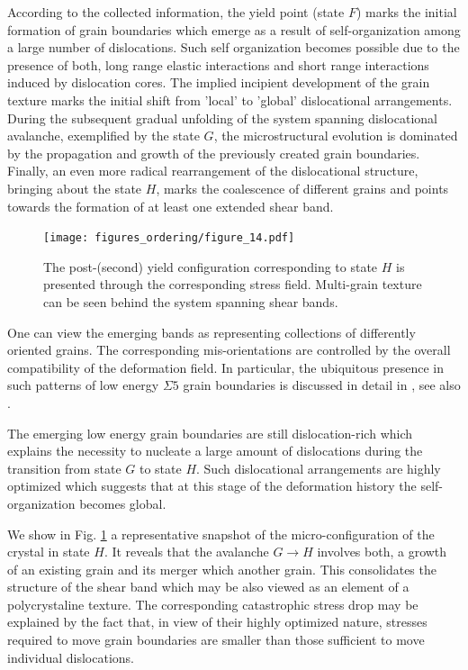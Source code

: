 \documentclass[aps,
superscriptaddress,notitlepage]{revtex4-1}
\begin{document}
According to the collected information,   the yield point (state $F$)  marks  the initial formation of grain boundaries which emerge as a result of  self-organization among  a large number of dislocations. Such self organization becomes possible due to the presence of both, long range elastic interactions and short range interactions induced by dislocation cores. The implied incipient development of the grain texture  marks the initial shift from   'local' to 'global'  dislocational arrangements. During  the subsequent gradual unfolding of the system spanning dislocational avalanche, exemplified by the state $G$,  the microstructural evolution is dominated by the propagation and growth of the previously created  grain boundaries. Finally,  an even more radical rearrangement of the dislocational structure,  bringing about the state $H$,   marks the  coalescence of different grains and points towards  the formation of  at least one extended shear band. 
 \begin{figure}[h!]
\texttt{[image: figures\_ordering/figure\_14.pdf]}
\caption{The post-(second) yield configuration corresponding to state $H$ is presented through   the corresponding stress field.  Multi-grain texture can be  seen behind the  system spanning shear bands.}
\label{grains3}
\end{figure}
One can view  the emerging bands as representing  collections of differently oriented  grains. The corresponding mis-orientations  are controlled by the overall compatibility of the deformation field. In particular, the  ubiquitous presence  in such patterns of  low energy $\Sigma 5$  grain boundaries is  discussed in detail in \cite{Baggio2023-qu}, see also \cite{Sutton1984-us,Priester2012-wx,Randle2024-tf}.

The emerging low energy grain  boundaries are  still dislocation-rich  which  explains the necessity to nucleate a large amount of dislocations during the transition from state $G$ to state $H$. Such dislocational arrangements are   highly optimized  which suggests that at this stage of the deformation history the  self-organization becomes  global.  

We show in  Fig. \ref{grains3} a representative snapshot of the micro-configuration of the crystal in state $H$. It reveals  that the  avalanche  $G \to H$ involves both,  a  growth of an  existing  grain and  its    merger which  another grain.  This  consolidates the structure of the shear band which may be also viewed as an element  of a polycrystaline texture.  The corresponding catastrophic stress drop  may  be explained by the fact that, in view of their highly optimized nature, stresses  required to move grain boundaries are smaller  than those sufficient to move individual dislocations. 
\end{document}
